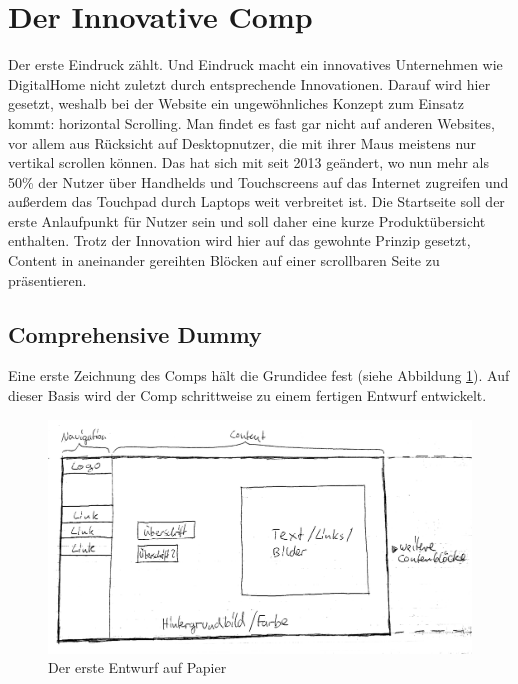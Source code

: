\section{Der Innovative Comp}
Der erste Eindruck zählt. Und Eindruck macht ein innovatives Unternehmen wie DigitalHome nicht zuletzt durch entsprechende Innovationen.
Darauf wird hier gesetzt, weshalb bei der Website ein ungewöhnliches Konzept zum Einsatz kommt: horizontal Scrolling. Man findet es fast gar nicht auf anderen Websites, vor allem aus Rücksicht auf Desktopnutzer, die mit ihrer Maus meistens nur vertikal scrollen können. Das hat sich mit seit 2013 geändert, wo nun mehr als 50\% der Nutzer über Handhelds und Touchscreens auf das Internet zugreifen und außerdem das Touchpad durch Laptops weit verbreitet ist.
Die Startseite soll der erste Anlaufpunkt für Nutzer sein und soll daher eine kurze Produktübersicht enthalten. Trotz der Innovation wird hier auf das gewohnte
Prinzip gesetzt, Content in aneinander gereihten Blöcken auf einer scrollbaren Seite zu präsentieren.

	\subsection{Comprehensive Dummy}

Eine erste Zeichnung des Comps hält die Grundidee fest (siehe Abbildung \ref{inno_Comp1}). Auf dieser Basis wird der Comp schrittweise zu einem fertigen Entwurf entwickelt.

\begin{figure} [hp]
\includegraphics[width=\textwidth]{./img/inno_comp1.png}
\caption{Der erste Entwurf auf Papier}
\label{inno_Comp1}
\end{figure}
